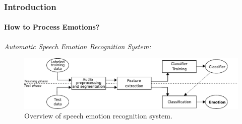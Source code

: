 \documentclass[10pt,usepdftitle=false,aspectratio=169]{beamer}
\begin{document}

\begin{frame}\frametitle{Introduction}
    \framesubtitle{How to Process Emotions?}
    


\vspace{2em}

\vspace{1em}
	\emph{Automatic Speech Emotion Recognition System:}
	\begin{figure}
	\includegraphics[width=\textwidth]{figures/EmotionRecognitionSystem.pdf}
	\caption{Overview of speech emotion recognition system.}
\end{figure}


	

\end{frame}







\end{document}
